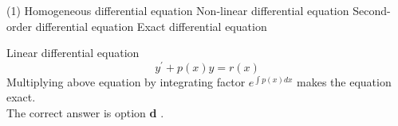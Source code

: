 \begin{enumerate}[label=\color{ocre}\textbf{\arabic*.}]
	\begin{tasks}(1)
		\task[\textbf{a.}] Homogeneous differential equation 
		\task[\textbf{b.}]Non-linear differential equation
		\task[\textbf{c.}]Second-order differential equation 
		\task[\textbf{d.}]Exact differential equation
	\end{tasks}
	\begin{answer}
		Linear differential equation
		$$
		y^{\prime}+p(x) y=r(x)
		$$
		Multiplying above equation by integrating factor $e^{\int p(x) d x}$ makes the equation exact.\\The correct answer is option \textbf{d} .
	\end{answer}
	
	
\end{enumerate}




